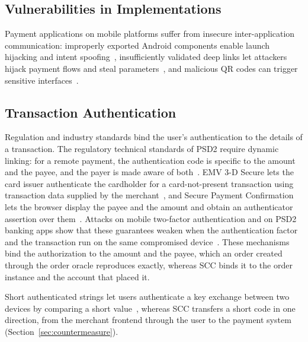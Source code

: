 \subsection{Vulnerabilities in Implementations}

Payment applications on mobile platforms suffer from insecure inter-application communication: improperly exported Android components enable launch hijacking and intent spoofing~\cite{Bhandari2017AndroidInterApp, Sun2023VenomAttackAndroid}, insufficiently validated deep links let attackers hijack payment flows and steal parameters~\cite{Liu2017MeasuringMobileDeep}, and malicious QR codes can trigger sensitive interfaces~\cite{Han2023MedusaAttackQR}.

\subsection{Transaction Authentication}

Regulation and industry standards bind the user's authentication to the details of a transaction.
The regulatory technical standards of PSD2 require dynamic linking: for a remote payment, the authentication code is specific to the amount and the payee, and the payer is made aware of both~\cite{EU2018RTS}.
EMV 3-D Secure lets the card issuer authenticate the cardholder for a card-not-present transaction using transaction data supplied by the merchant~\cite{EMVCo2023ThreeDS}, and Secure Payment Confirmation lets the browser display the payee and the amount and obtain an authenticator assertion over them~\cite{W3C2026SPC}.
Attacks on mobile two-factor authentication and on PSD2 banking apps show that these guarantees weaken when the authentication factor and the transaction run on the same compromised device~\cite{Konoth2016Anywhere, Haupert2019PSD2}.
These mechanisms bind the authorization to the amount and the payee, which an order created through the order oracle reproduces exactly, whereas SCC binds it to the order instance and the account that placed it.

Short authenticated strings let users authenticate a key exchange between two devices by comparing a short value~\cite{Vaudenay2005SAS}, whereas SCC transfers a short code in one direction, from the merchant frontend through the user to the payment system (Section~\ref{sec:countermeasure}).
